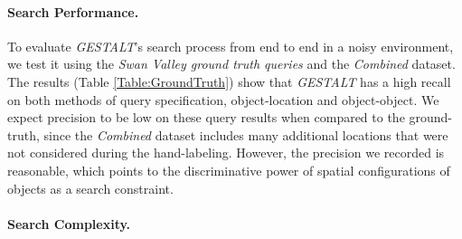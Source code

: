 \paragraph{Search Performance.}

To evaluate \emph{GESTALT}'s search process from end to end in a noisy environment, we test it using the \textit{Swan Valley ground truth queries} and the \textit{Combined} dataset.
The results (Table \ref{Table:GroundTruth}) show that \emph{GESTALT} has a high recall on both methods of query specification, object-location and object-object.
We expect precision to be low on these query results when compared to the ground-truth, since the \textit{Combined} dataset includes many additional locations that were not considered during the hand-labeling.
However, the precision we recorded is reasonable, which points to the discriminative power of spatial configurations of objects as a search constraint.


\paragraph{Search Complexity.}

